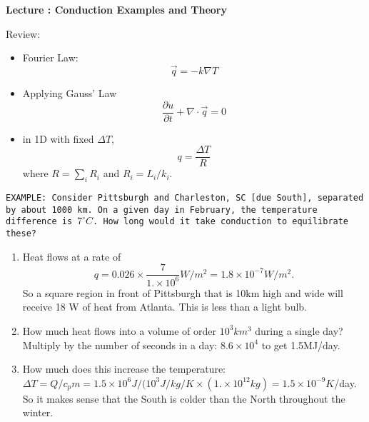 \documentclass[11pt]{book}
\def\be{\begin{equation}}
\def\ee{\end{equation}}
\newcommand\example[1]{{\tt EXAMPLE: #1}}
\newcommand\bee{\begin{enumerate}}
\newcommand\eee{\end{enumerate}}
\newcommand\lecture[1]{\newpage
\addtocounter{lectureno}{1}
\setcounter{secno}{0}
\begin{center}
 {\bf Lecture \arabic{lectureno}: #1}
\end{center}
}
\newcounter{lectureno}
\newcounter{secno}
\begin{document}
\lecture{Conduction Examples and Theory}

Review:
\begin{itemize}
\item Fourier Law: 
\be \vec q = -k\nabla T
\ee
\item Applying Gauss' Law
\be
\frac{\partial u}{\partial t} + \nabla\cdot \vec q=0\ee
\item in 1D with fixed $\Delta T$, 
\be q = \frac{\Delta T}{R}\ee
where $R=\sum_i R_i$ and $R_i=L_i/k_i$.
\end{itemize}



\example{Consider Pittsburgh and Charleston, SC [due South], separated by about 1000 km. On a given day in February, the temperature difference is $7^\circ C$. How long would it take conduction to equilibrate these? 
\bee
\item Heat flows at a rate of 
\be
q=0.026\times \frac{7}{1.\times 10^6} W/m^2=1.8\times 10^{-7} W/m^2. \ee
So a square region in front of Pittsburgh that is 10km high and wide will receive 18 W of heat from Atlanta. This is less than a light bulb.
\item How much heat flows into a volume of order $10^3km^3$ during a single day?  Multiply by the number of seconds in a day: $8.6\times 10^4$ to get 1.5MJ/day.
\item How much does this increase the temperature: $\Delta T = Q/c_pm=1.5\times 10^6J/(10^3J/kg/K\times (1.\times 10^{12}kg) =1.5\times 10^{-9}K$/day. So it makes sense that the South is colder than the North throughout the winter.\eee}
\end{document}
